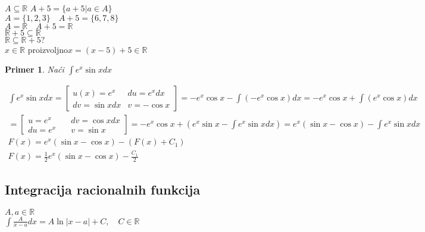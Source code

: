 \documentclass{article}
\newtheorem{prim}{Primer}[section]
\begin{document}
$A \subseteq \mathbb{R}$ $A + 5 = \{a+5 | a \in A\}$\\
$A = \{1,2,3\}\quad A + 5 = \{6, 7, 8\}$\\
$A = \mathbb{R}\quad A + 5 = \mathbb{R}$\\
$\mathbb{R} + 5 \subseteq \mathbb{R}$\\
$\mathbb{R} \subseteq \mathbb{R} + 5 ?$\\
$x \in \mathbb{R}$ proizvoljno\quad $x = (x-5) + 5 \in \mathbb{R}$
\begin{primbox}
    \begin{prim}
        Naći $\int e^x \sin x dx$
    \end{prim}
    \begin{align*}
        \int e^x \sin x dx =
        \left [ \begin{alignedat}{2}
                        u(x) = e^x     & du = e^x dx \\
                        dv = \sin x dx & v = -\cos x
                    \end{alignedat} \right ]
        = -e^x\cos x - \int (-e^x \cos x)dx
        =  -e^x\cos x + \int (e^x \cos x) dx         \\
        = \left [ \begin{alignedat}{2}
                          u = e^x \quad  & dv = \cos x dx \\
                          du = e^x \quad & v = \sin x
                      \end{alignedat} \right ]
        =  -e^x\cos x + (e^x \sin x - \int e^x\sin x dx)
        =  e^x(\sin x - \cos x) - \int e^x \sin x dx \\
        F(x) = e^x(\sin x - \cos x) - (F(x) + C_1)   \\
        F(x) = \frac{1}{2} e^x(\sin x - \cos x) - \frac{C_1}{2}
    \end{align*}
\end{primbox}
\subsection{Integracija racionalnih funkcija}
\begin{primbox}
    $A, a \in \mathbb{R}$\\
    $\int \frac{A}{x-a}dx = A\ln|x-a| + C, \quad C \in \mathbb{R}$
\end{primbox}
\end{document}
